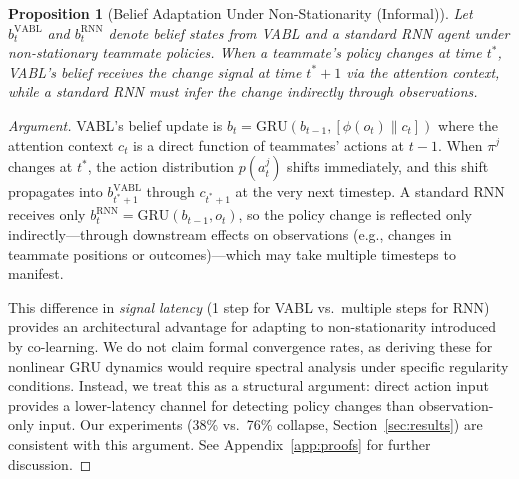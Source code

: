 \documentclass{article}
\theoremstyle{plain}
\newtheorem{proposition}[theorem]{Proposition}
\theoremstyle{definition}
\theoremstyle{remark}
\begin{document}
\begin{proposition}[Belief Adaptation Under Non-Stationarity (Informal)]
\label{prop:stability}
Let $b_t^{\mathrm{VABL}}$ and $b_t^{\mathrm{RNN}}$ denote belief states from VABL and a standard RNN agent under non-stationary teammate policies. When a teammate's policy changes at time $t^*$, VABL's belief receives the change signal at time $t^*{+}1$ via the attention context, while a standard RNN must infer the change indirectly through observations.
\end{proposition}

\begin{proof}[Argument]
VABL's belief update is $b_t = \mathrm{GRU}(b_{t-1}, [\phi(o_t) \| c_t])$ where the attention context $c_t$ is a direct function of teammates' actions at $t{-}1$. When $\pi^j$ changes at $t^*$, the action distribution $p(a_t^j)$ shifts immediately, and this shift propagates into $b_{t^*+1}^{\mathrm{VABL}}$ through $c_{t^*+1}$ at the very next timestep. A standard RNN receives only $b_t^{\mathrm{RNN}} = \mathrm{GRU}(b_{t-1}, o_t)$, so the policy change is reflected only indirectly---through downstream effects on observations (e.g., changes in teammate positions or outcomes)---which may take multiple timesteps to manifest.

This difference in \emph{signal latency} (1 step for VABL vs.\ multiple steps for RNN) provides an architectural advantage for adapting to non-stationarity introduced by co-learning. We do not claim formal convergence rates, as deriving these for nonlinear GRU dynamics would require spectral analysis under specific regularity conditions. Instead, we treat this as a structural argument: direct action input provides a lower-latency channel for detecting policy changes than observation-only input. Our experiments (38\% vs.\ 76\% collapse, Section~\ref{sec:results}) are consistent with this argument. See Appendix~\ref{app:proofs} for further discussion.
\end{proof}
\end{document}
